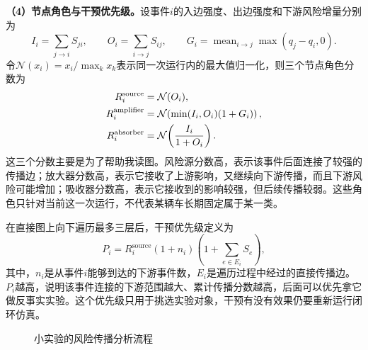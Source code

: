 \documentclass[UTF8,zihao=5,a4paper]{ctexart}
\begin{document}
\textbf{（4）节点角色与干预优先级。}设事件$i$的入边强度、出边强度和下游风险增量分别为
\begin{equation}
I_i=\sum_{j\rightarrow i}S_{ji},\qquad
O_i=\sum_{i\rightarrow j}S_{ij},\qquad
G_i=\operatorname{mean}_{i\rightarrow j}\max(q_j-q_i,0).
\label{eq:role-base}
\end{equation}
令$\mathcal{N}(x_i)=x_i/\max_k x_k$表示同一次运行内的最大值归一化，则三个节点角色分数为
\begin{align}
R_i^{\mathrm{source}}&=\mathcal{N}(O_i), \notag\\
R_i^{\mathrm{amplifier}}&=\mathcal{N}\!\left(\min(I_i,O_i)(1+G_i)\right), \label{eq:roles}\\
R_i^{\mathrm{absorber}}&=\mathcal{N}\!\left(\frac{I_i}{1+O_i}\right). \notag
\end{align}
这三个分数主要是为了帮助我读图。风险源分数高，表示该事件后面连接了较强的传播边；放大器分数高，表示它接收了上游影响，又继续向下游传播，而且下游风险可能增加；吸收器分数高，表示它接收到的影响较强，但后续传播较弱。这些角色只针对当前这一次运行，不代表某辆车长期固定属于某一类。

在直接图上向下遍历最多三层后，干预优先级定义为
\begin{equation}
P_i=R_i^{\mathrm{source}}(1+n_i)\left(1+\sum_{e\in E_i}S_e\right),
\label{eq:intervention}
\end{equation}
其中，$n_i$是从事件$i$能够到达的下游事件数，$E_i$是遍历过程中经过的直接传播边。$P_i$越高，说明该事件连接的下游范围越大、累计传播分数越高，后面可以优先拿它做反事实实验。这个优先级只用于挑选实验对象，干预有没有效果仍要重新运行闭环仿真。

\begin{figure}[H]
\centering
{}
\caption{小实验的风险传播分析流程}
\label{fig:flow}
\end{figure}
\end{document}
